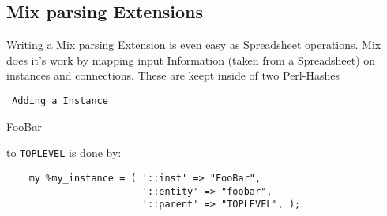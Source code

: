 \documentclass[a4paper,12pt]{article}
\begin{document}
\subsection{Mix parsing Extensions}
Writing a Mix parsing Extension is even easy as Spreadsheet operations. Mix does it's work by mapping input Information (taken from a Spreadsheet) on instances and connections. These are keept inside of two Perl-Hashes {\tt %
  Adding a Instance \begin{tt}FooBar\end{tt} to {\tt TOPLEVEL} is done by:\newline
\begin{verbatim}
    my %my_instance = ( '::inst' => "FooBar",
                        '::entity' => "foobar",
                        '::parent' => "TOPLEVEL", );


\end{verbatim}}
\end{document}
